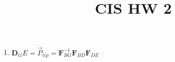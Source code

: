 \documentclass{article}
\title{CIS HW 2}
\newcommand{\m}[1]{\mathbf{#1}}
\begin{document}
1.
$\m{D}_GE = \vec P_{tip} = \m F_{BG}^{-1} \m F_{BD} \m F_{DE}$
\end{document}
